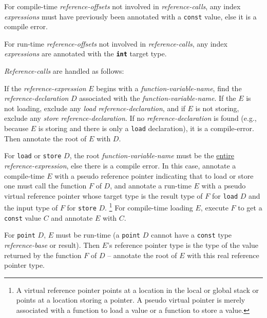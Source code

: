 \documentclass[12pt]{article}
\newcommand{\TT}[1]{{\tt \bfseries #1}}
\begin{document}
\begin{enumerate}
For compile-time {\em reference-offsets} not involved in {\em reference-calls},
any index {\em expressions} must have previously been annotated with
a {\tt const} value, else it is a compile error.

For run-time {\em reference-offsets} not involved in {\em reference-calls},
any index {\em expressions} are annotated with the \TT{int} target type.

{\em Reference-calls} are handled as follows:

If the {\em reference-expression} $E$ begins with a
{\em function-variable-name}\label{FUNCTION-VARIABLE-NAME-STEP},
find the {\em reference-declaration} $D$ associated with
the {\em function-variable-name}.  If the $E$ is not loading, exclude
any {\em load} {\em reference-declaration}, and if $E$ is not storing,
exclude any {\em store} {\em reference-declaration}.  If no
{\em reference-declaration} is found (e.g., because $E$ is storing
and there is only a {\tt load} declaration), it is a compile-error.
Then annotate the root of $E$ with $D$.

For {\tt load} or {\tt store}
$D$, the root {\em function-variable-name} must be the
\underline{entire} {\em reference-expression}, else there is a
compile error.  In this case, annotate a compile-time $E$ with 
a pseudo reference pointer indicating that to load or store one
must call the function $F$ of $D$, and annotate a run-time $E$ with
a pseudo virtual reference pointer whose target type is the
result type of $F$ for {\tt load} $D$ and the input type of $F$
for {\tt store} $D$.
\footnote{A virtual reference pointer points
at a location in the local or global stack or points at a location
storing a pointer.  A pseudo virtual pointer
is merely associated with a function to load a value or a function to store
a value.}
For compile-time loading $E$, execute $F$
to get a {\tt const} value $C$ and annotate $E$ with $C$.

For {\tt point} $D$, $E$ must be run-time
(a {\tt point} $D$ cannot have a {\tt const} type {\em reference-base}
or result).  Then $E$'s reference pointer
type is the type of the value returned by the function $F$ of $D$ --
annotate the root of $E$ with this real reference pointer type.


\end{enumerate}
\end{document}
